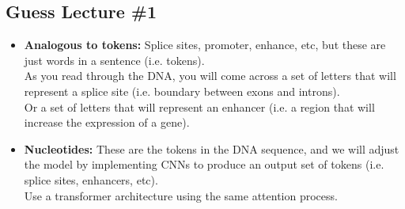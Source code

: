 \subsection{Guess Lecture \#1}
\begin{summary}
    \begin{itemize}
        \item \textbf{Analogous to tokens:} Splice sites, promoter, enhance, etc, but these are just words in a sentence (i.e. tokens). \\
        As you read through the DNA, you will come across a set of letters that will represent a splice site (i.e. boundary between exons and introns). \\
        Or a set of letters that will represent an enhancer (i.e. a region that will increase the expression of a gene). \\
        \item \textbf{Nucleotides:} These are the tokens in the DNA sequence, and we will adjust the model by implementing CNNs to produce an output set of tokens (i.e. splice sites, enhancers, etc).\\
        Use a transformer architecture using the same attention process. 
    \end{itemize}
\end{summary}
